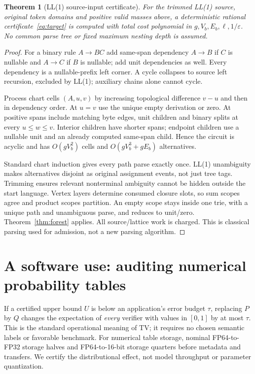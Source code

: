 \documentclass[11pt]{article}
\newtheorem{theorem}{Theorem}
\begin{document}
\begin{theorem}[LL(1) source-input certificate]\label{thm:grammar}
For the trimmed LL(1) source, original token domains and positive valid
masses above, a deterministic rational certificate~\eqref{eq:target} is
computed with total cost polynomial in $g,V_b,E_b,\ell,1/\varepsilon$.
No common parse tree or fixed maximum nesting depth is assumed.
\end{theorem}
\begin{proof}
For a binary rule $A\to BC$ add same-span dependency $A\to B$ if $C$ is
nullable and $A\to C$ if $B$ is nullable; add unit dependencies as well.
Every dependency is a nullable-prefix left corner. A cycle collapses to
source left recursion, excluded by LL(1); auxiliary chains alone cannot cycle.

Process chart cells $(A,u,v)$ by increasing topological difference $v-u$
and then in dependency order. At $u=v$ use the unique empty derivation or
zero. At positive spans include matching byte edges, unit children and
binary splits at every $u\leq w\leq v$. Interior children have shorter
spans; endpoint children use a nullable unit and an already computed
same-span child. Hence the circuit is acyclic and has $O(gV_b^2)$ cells
and $O(gV_b^3+gE_b)$ alternatives.

Standard chart induction gives every path parse exactly once. LL(1)
unambiguity makes alternatives disjoint as original assignment events, not
just tree tags. Trimming ensures relevant nonterminal ambiguity cannot be
hidden outside the start language. Vertex layers determine consumed closure
slots, so sum scopes agree and product scopes partition. An empty scope stays
inside one trie, with a unique path and unambiguous parse, and reduces to
unit/zero. Theorem~\ref{thm:forest} applies. All source/lattice work is charged.
This is classical parsing used for admission, not a new parsing algorithm.
\end{proof}

\section{A software use: auditing numerical probability tables}
If a certified upper bound $U$ is below an application's error budget $\tau$,
replacing $P$ by $Q$ changes the expectation of \emph{every} verifier with
values in $[0,1]$ by at most $\tau$. This is the standard operational meaning
of TV; it requires no chosen semantic labels or favorable benchmark.
For numerical table storage, nominal FP64-to-FP32 storage halves and
FP64-to-16-bit storage quarters before metadata and transfers. We certify
the distributional effect, not model throughput or parameter quantization.
\end{document}
